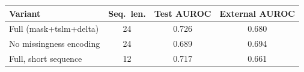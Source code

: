 \begin{tabular}{lccc}
\toprule
Variant & Seq.\ len. & Test AUROC & External AUROC \\
\midrule
Full (mask+tslm+delta) & 24 & 0.726 & 0.680 \\
No missingness encoding & 24 & 0.689 & 0.694 \\
Full, short sequence & 12 & 0.717 & 0.661 \\
\bottomrule
\end{tabular}
